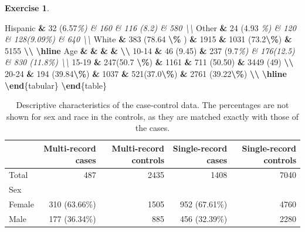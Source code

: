 \documentclass[
]{book}
\newenvironment{Shaded}{\begin{snugshade}}{\end{snugshade}}
\newcommand{\CommentTok}[1]{\textcolor[rgb]{0.56,0.35,0.01}{\textit{#1}}}
\newcommand{\ExtensionTok}[1]{#1}
\newcommand{\FunctionTok}[1]{\textcolor[rgb]{0.13,0.29,0.53}{\textbf{#1}}}
\newcommand{\KeywordTok}[1]{\textcolor[rgb]{0.13,0.29,0.53}{\textbf{#1}}}
\newcommand{\NormalTok}[1]{#1}
\newcommand{\OperatorTok}[1]{\textcolor[rgb]{0.81,0.36,0.00}{\textbf{#1}}}
\theoremstyle{definition}
\theoremstyle{definition}
\theoremstyle{definition}
\newtheorem{exercise}{Exercise}[chapter]
\theoremstyle{definition}
\theoremstyle{remark}
\begin{document}
\begin{exercise}
\begin{Shaded}
\begin{Highlighting}[]
\NormalTok{Hispanic }\OperatorTok{\&}\NormalTok{ 32 (6.57}\CommentTok{\%) \& 160 \& 116 (8.2) \& 580 \textbackslash{}\textbackslash{}}
\NormalTok{Other }\OperatorTok{\&}\NormalTok{ 24 (4.93 }\CommentTok{\%) \& 120 \& 128(9.09\%) \& 640 \textbackslash{}\textbackslash{}}
\NormalTok{White }\OperatorTok{\&}\NormalTok{ 383 (78.64 }\FunctionTok{\textbackslash{}\%}\NormalTok{ ) }\OperatorTok{\&}\NormalTok{ 1915 }\OperatorTok{\&}\NormalTok{ 1031 (73.2}\FunctionTok{\textbackslash{}\%}\NormalTok{) }\OperatorTok{\&}\NormalTok{ 5155 }\FunctionTok{\textbackslash{}\textbackslash{}}
\FunctionTok{\textbackslash{}hline}
\NormalTok{Age }\OperatorTok{\&}   \OperatorTok{\&}   \OperatorTok{\&}   \OperatorTok{\&}   \FunctionTok{\textbackslash{}\textbackslash{}}
\NormalTok{10{-}14 }\OperatorTok{\&}\NormalTok{ 46 (9.45) }\OperatorTok{\&}\NormalTok{ 237 (9.7}\CommentTok{\%) \& 176(12.5) \& 830 (11.8\%) \textbackslash{}\textbackslash{}}
\NormalTok{15{-}19 }\OperatorTok{\&}\NormalTok{ 247(50.7 }\FunctionTok{\textbackslash{}\%}\NormalTok{) }\OperatorTok{\&}\NormalTok{ 1161 }\OperatorTok{\&}\NormalTok{ 711 (50.50) }\OperatorTok{\&}\NormalTok{ 3449 (49) }\FunctionTok{\textbackslash{}\textbackslash{}}
\NormalTok{20{-}24 }\OperatorTok{\&}\NormalTok{ 194 (39.84}\FunctionTok{\textbackslash{}\%}\NormalTok{) }\OperatorTok{\&}\NormalTok{ 1037 }\OperatorTok{\&}\NormalTok{ 521(37.0}\FunctionTok{\textbackslash{}\%}\NormalTok{) }\OperatorTok{\&}\NormalTok{ 2761 (39.22}\FunctionTok{\textbackslash{}\%}\NormalTok{) }\FunctionTok{\textbackslash{}\textbackslash{}}
\FunctionTok{\textbackslash{}hline}
\KeywordTok{\textbackslash{}end}\NormalTok{\{}\ExtensionTok{tabular}\NormalTok{\}}
\KeywordTok{\textbackslash{}end}\NormalTok{\{}\ExtensionTok{table}\NormalTok{\}}
\end{Highlighting}
\end{Shaded}

\begin{table}[h]
\singlespacing
\centering 
\scriptsize
\caption{Descriptive characteristics of the case-control data. The percentages are not shown for sex and race in the controls, as they are matched exactly with those of the cases. 
}
\begin{tabular}[t]{l r r r r}
\toprule
 & Multi-record cases & Multi-record controls & Single-record cases & Single-record controls \\
\midrule

Total & 487 & 2435 & 1408 & 7040  \\

Sex &  &  &  & \\
\hspace{2em}Female & 310 (63.66\%) & 1505 & 952 (67.61\%) & 4760 \\
\hspace{2em}Male & 177 (36.34\%) & 885 & 456 (32.39\%) & 2280 \\


\end{tabular}
\end{table}
\end{exercise}
\end{document}
